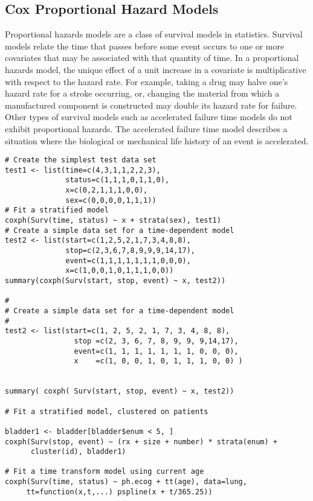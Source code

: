 \subsection*{Cox Proportional Hazard Models}
Proportional hazards models are a class of survival models in statistics. Survival models relate the time that passes before some event occurs to one or more covariates that may be associated with that quantity of time. In a proportional hazards model, the unique effect of a unit increase in a covariate is multiplicative with respect to the hazard rate. For example, taking a drug may halve one's hazard rate for a stroke occurring, or, changing the material from which a manufactured component is constructed may double its hazard rate for failure. Other types of survival models such as accelerated failure time models do not exhibit proportional hazards. The accelerated failure time model describes a situation where the biological or mechanical life history of an event is accelerated.


\begin{framed}
\begin{verbatim}
# Create the simplest test data set 
test1 <- list(time=c(4,3,1,1,2,2,3), 
              status=c(1,1,1,0,1,1,0), 
              x=c(0,2,1,1,1,0,0), 
              sex=c(0,0,0,0,1,1,1)) 
# Fit a stratified model 
coxph(Surv(time, status) ~ x + strata(sex), test1) 
# Create a simple data set for a time-dependent model 
test2 <- list(start=c(1,2,5,2,1,7,3,4,8,8), 
              stop=c(2,3,6,7,8,9,9,9,14,17), 
              event=c(1,1,1,1,1,1,1,0,0,0), 
              x=c(1,0,0,1,0,1,1,1,0,0)) 
summary(coxph(Surv(start, stop, event) ~ x, test2)) 

#
# Create a simple data set for a time-dependent model
#
test2 <- list(start=c(1, 2, 5, 2, 1, 7, 3, 4, 8, 8),
                stop =c(2, 3, 6, 7, 8, 9, 9, 9,14,17),
                event=c(1, 1, 1, 1, 1, 1, 1, 0, 0, 0),
                x    =c(1, 0, 0, 1, 0, 1, 1, 1, 0, 0) )


summary( coxph( Surv(start, stop, event) ~ x, test2))

# Fit a stratified model, clustered on patients 

bladder1 <- bladder[bladder$enum < 5, ] 
coxph(Surv(stop, event) ~ (rx + size + number) * strata(enum) + 
      cluster(id), bladder1)

# Fit a time transform model using current age
coxph(Surv(time, status) ~ ph.ecog + tt(age), data=lung,
     tt=function(x,t,...) pspline(x + t/365.25))

\end{verbatim}
\end{framed}
